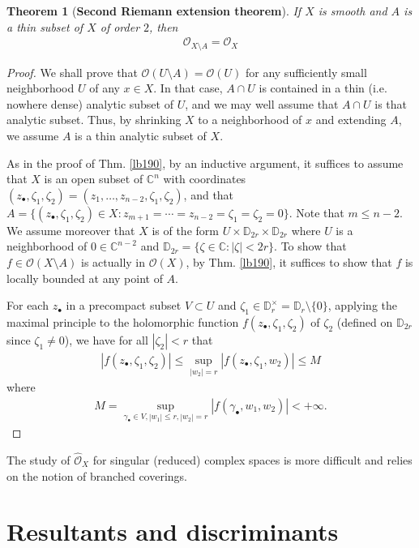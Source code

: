 \documentclass[12pt,b5paper,notitlepage]{report}
\theoremstyle{definition}
\theoremstyle{plain}
\newtheorem{thm}[df]{Theorem}
\newcommand{\scr}{\mathscr}
\newcommand{\blt}{\bullet}
\newcommand{\Cbb}{\mathbb C}
\newcommand{\Dbb}{\mathbb D}
\newcommand{\Owht}{\widehat{\scr O}}
\numberwithin{equation}{section}
\begin{document}
\begin{thm}[\textbf{Second Riemann extension theorem}]\label{lb219}
If $X$ is smooth and $A$ is a thin subset of $X$ of order $2$, then
\begin{align*}
\scr O_{X\setminus A}=\scr O_X
\end{align*}
\end{thm}


\begin{proof}
We shall prove that $\scr O(U\setminus A)=\scr O(U)$ for any sufficiently small neighborhood $U$ of any $x\in X$. In that case, $A\cap U$ is contained in a thin (i.e. nowhere dense) analytic subset of $U$, and we may well assume that $A\cap U$ is that analytic subset. Thus, by shrinking $X$ to a neighborhood of $x$ and extending $A$, we assume $A$ is a thin analytic subset of $X$.

As in the proof of Thm. \ref{lb190}, by an inductive argument, it suffices to assume that  $X$ is an open subset of $\Cbb^n$ with coordinates $(z_\blt,\zeta_1,\zeta_2)=(z_1,\dots,z_{n-2},\zeta_1,\zeta_2)$, and that $A=\{(z_\blt,\zeta_1,\zeta_2)\in X:z_{m+1}=\cdots=z_{n-2}=\zeta_1=\zeta_2=0\}$. Note that $m\leq n-2$. We assume moreover that $X$ is of the form $U\times\Dbb_{2r}\times\Dbb_{2r}$ where $U$ is a neighborhood of $0\in\Cbb^{n-2}$ and $\Dbb_{2r}=\{\zeta\in\Cbb:|\zeta|<2r\}$. To show that $f\in\scr O(X\setminus A)$ is actually in $\scr O(X)$, by Thm. \ref{lb190}, it suffices to show that $f$ is locally bounded at any point of $A$.

For each $z_\blt$ in a precompact subset $V\subset U$ and $\zeta_1\in\Dbb_r^\times=\Dbb_r\setminus\{0\}$, applying the maximal principle to the holomorphic function $f(z_\blt,\zeta_1,\zeta_2)$ of $\zeta_2$ (defined on $\Dbb_{2r}$ since $\zeta_1\neq 0$), we have for all $|\zeta_2|<r$ that
\begin{align*}
|f(z_\blt,\zeta_1,\zeta_2)|\leq \sup_{|w_2|=r}|f(z_\blt,\zeta_1,w_2)|\leq M
\end{align*}
where
\begin{align*}
M=\sup_{\gamma_\blt\in V,|w_1|\leq r,|w_2|=r}|f(\gamma_\blt,w_1,w_2)|<+\infty.
\end{align*}
\end{proof}

The study of $\Owht_X$ for singular (reduced) complex spaces is more difficult and relies on the notion of branched coverings.


\section{Resultants and discriminants}
\end{document}
